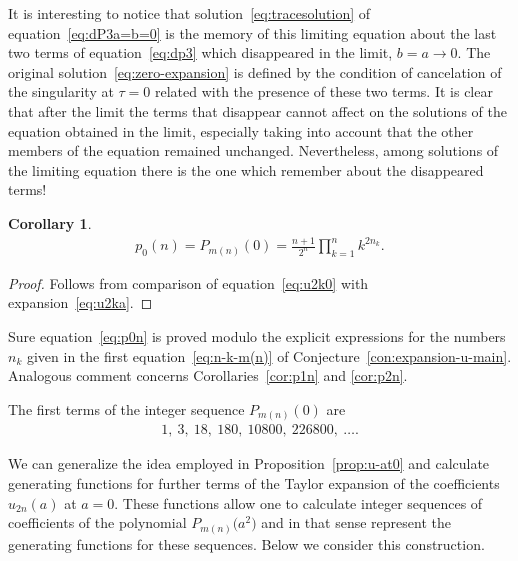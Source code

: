 \documentclass[pdftex]{sigma}
\numberwithin{equation}{section}
\newtheorem{Corollary}[Theorem]{Corollary}
\begin{document}
\begin{Remark}It is interesting to notice that solution~\eqref{eq:tracesolution} of equation~\eqref{eq:dP3a=b=0}
is the memory of this limiting equation about the last two terms of equation~\eqref{eq:dp3} which
disappeared in the limit, $b=a\to0$. The original solution~\eqref{eq:zero-expansion} is defined
by the condition of cancelation of the singularity at $\tau=0$ related with the presence of these
two terms. It is clear that after the limit the terms that disappear cannot affect on the solutions
of the equation obtained in the limit, especially taking into account that the other members of
the equation remained unchanged. Nevertheless, among solutions of the limiting equation there is the
one which remember about the disappeared terms!
\end{Remark}
\begin{Corollary}
\begin{gather}\label{eq:p0n}
p_0(n)=P_{m(n)}(0)=\frac{n+1}{2^n}\prod\limits_{k=1}^nk^{2n_k}.
\end{gather}
\end{Corollary}
\begin{proof}
Follows from comparison of equation~\eqref{eq:u2k0} with expansion~\eqref{eq:u2ka}.
\end{proof}
\begin{Remark}
Sure equation~\eqref{eq:p0n} is proved modulo the explicit expressions for the numbers $n_k$
given in the first equation~\eqref{eq:n-k-m(n)} of Conjecture~\ref{con:expansion-u-main}. Analogous comment
concerns Corollaries~\ref{cor:p1n} and \ref{cor:p2n}.
\end{Remark}
\begin{Remark}
The first terms of the integer sequence $P_{m(n)}(0)$ are
\begin{gather*}
1, \ 3, \ 18, \ 180, \ 10800, \ 226800, \ \ldots.
\end{gather*}
\end{Remark}

We can generalize the idea employed in Proposition~\ref{prop:u-at0} and calculate generating functions for further
terms of the Taylor expansion of the coefficients $u_{2n}(a)$ at $a=0$. These functions allow one to calculate
integer sequences of coefficients of the polynomial $P_{m(n)}\big(a^2\big)$ and in that sense represent the generating
functions for these sequences. Below we consider this construction.
\end{document}
